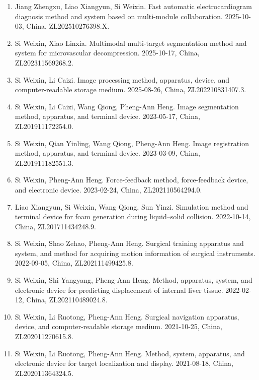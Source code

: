 \documentclass[a4paper,12pt,english]{curve}
\begin{document}
\begin{enumerate}
\setlength{\itemsep}{0pt}
\setlength{\parsep}{0pt}
\setlength{\topsep}{0.4ex}
\item Jiang Zhengxu, Liao Xiangyun, Si Weixin. Fast automatic electrocardiogram diagnosis method and system based on multi-module collaboration. 2025-10-03, China, ZL202510276398.X.

\item Si Weixin, Xiao Linxia. Multimodal multi-target segmentation method and system for microvascular decompression. 2025-10-17, China, ZL202311569268.2.

\item Si Weixin, Li Caizi. Image processing method, apparatus, device, and computer-readable storage medium. 2025-08-26, China, ZL202210831407.3.

\item Si Weixin, Li Caizi, Wang Qiong, Pheng-Ann Heng. Image segmentation method, apparatus, and terminal device. 2023-05-17, China, ZL201911172254.0.

\item Si Weixin, Qian Yinling, Wang Qiong, Pheng-Ann Heng. Image registration method, apparatus, and terminal device. 2023-03-09, China, ZL201911182551.3.

\item Si Weixin, Pheng-Ann Heng. Force-feedback method, force-feedback device, and electronic device. 2023-02-24, China, ZL202110564294.0.

\item Liao Xiangyun, Si Weixin, Wang Qiong, Sun Yinzi. Simulation method and terminal device for foam generation during liquid--solid collision. 2022-10-14, China, ZL201711434248.9.

\item Si Weixin, Shao Zehao, Pheng-Ann Heng. Surgical training apparatus and system, and method for acquiring motion information of surgical instruments. 2022-09-05, China, ZL202111499425.8.

\item Si Weixin, Shi Yangyang, Pheng-Ann Heng. Method, apparatus, system, and electronic device for predicting displacement of internal liver tissue. 2022-02-12, China, ZL202110489024.8.

\item Si Weixin, Li Ruotong, Pheng-Ann Heng. Surgical navigation apparatus, device, and computer-readable storage medium. 2021-10-25, China, ZL202011270615.8.

\item Si Weixin, Li Ruotong, Pheng-Ann Heng. Method, system, apparatus, and electronic device for target localization and display. 2021-08-18, China, ZL202011364324.5.


\end{enumerate}
\end{document}
